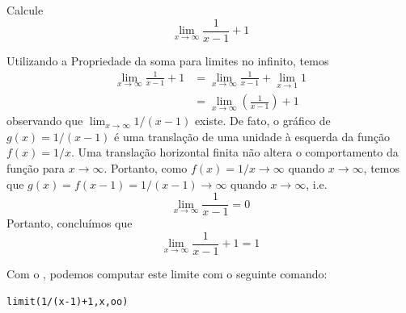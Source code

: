 \cleardoublepage\documentclass[../main.tex]{subfiles}
\begin{document}
\begin{exeresol}
  Calcule
  \begin{equation*}
    \lim_{x\to \infty} \frac{1}{x-1}+1
  \end{equation*}
  \begin{resol}
  Utilizando a Propriedade da soma para limites no infinito, temos
  \begin{align*}
    \lim_{x\to\infty} \frac{1}{x-1} + 1 &= \lim_{x\to \infty} \frac{1}{x-1} + \lim_{x\to 1} 1\\
                                        &= \lim_{x\to \infty} \left(\frac{1}{x-1}\right)+1
  \end{align*}
  observando que $\lim_{x\to \infty}1/(x-1)$ existe. De fato, o gráfico de $g(x) = 1/(x-1)$ é uma translação de uma unidade à esquerda da função $f(x)=1/x$. Uma translação horizontal finita não altera o comportamento da função para $x\to \infty$. Portanto, como $f(x)=1/x\to\infty$ quando $x\to\infty$, temos que $g(x)=f(x-1)=1/(x-1)\to\infty$ quando $x\to\infty$, i.e.
  \begin{equation*}
    \lim_{x\to\infty}\frac{1}{x-1} = 0
  \end{equation*}
  Portanto, concluímos que
  \begin{equation*}
    \lim_{x\to \infty} \frac{1}{x-1} + 1 = 1
  \end{equation*}

  
  Com o \geogebra, podemos computar este limite com o seguinte comando:
\begin{verbatim}
limit(1/(x-1)+1,x,oo)
\end{verbatim}
 
\end{resol}
\end{exeresol}
\end{document}
